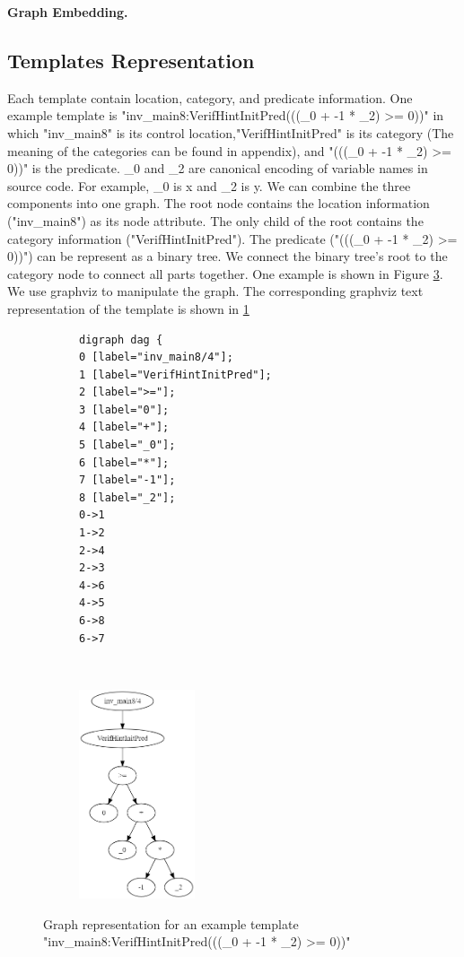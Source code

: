\documentclass{article}
\begin{document}
\textbf{Graph Embedding.} 



\subsection{Templates Representation}



Each template contain location, category, and predicate information. One example template is "inv\_main8:VerifHintInitPred(((\_0 + -1 * \_2) >= 0))" in which "inv\_main8" is its control location,"VerifHintInitPred" is its category (The meaning of the categories can be found in appendix), and "(((\_0 + -1 * \_2) >= 0))" is the predicate. \_0 and \_2 are canonical encoding of variable names in source code. For example, \_0 is x and \_2 is y.  We can combine the three components into one graph. The root node contains the location information ("inv\_main8") as its node attribute. The only child of the root contains the category information ("VerifHintInitPred"). The predicate ("(((\_0 + -1 * \_2) >= 0))") can be represent as a binary tree. We connect the binary tree's root to the category node to connect all parts together. One example is shown in Figure \ref{templateGraph}. We use graphviz to manipulate the graph. The corresponding graphviz text representation of the template is shown in \ref{templateGraphviz}
\begin{figure}[h]
\centering
\begin{subfigure}{0.3\textwidth}
\begin{lstlisting}
digraph dag {
0 [label="inv_main8/4"];
1 [label="VerifHintInitPred"];
2 [label=">="];
3 [label="0"];
4 [label="+"];
5 [label="_0"];
6 [label="*"];
7 [label="-1"];
8 [label="_2"];
0->1
1->2
2->4
2->3
4->6
4->5
6->8
6->7
\end{lstlisting}\label{templateGraphviz}
\end{subfigure}   ~~~~~~~~~~~~
\begin{subfigure}{0.3\textwidth}
  \includegraphics[width=3.4cm]{graph/template_graph}\\
  \label{templateGraph}
  \end{subfigure}
  \caption{Graph representation for an example template "inv\_main8:VerifHintInitPred(((\_0 + -1 * \_2) >= 0))"}
\end{figure}
\end{document}
